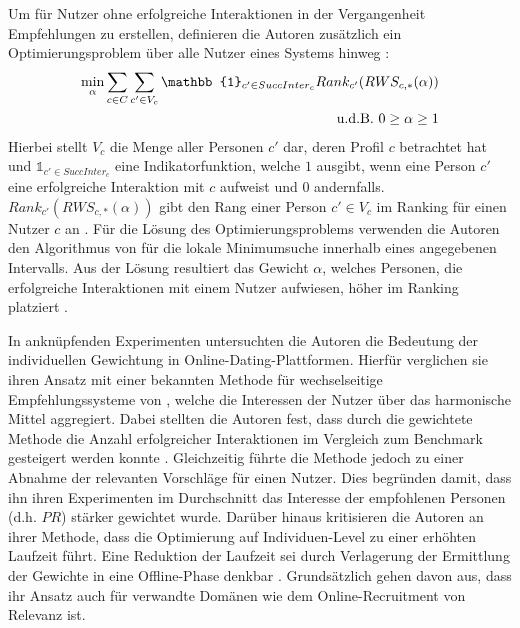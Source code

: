 Um für Nutzer ohne erfolgreiche Interaktionen in der Vergangenheit Empfehlungen zu erstellen, definieren die Autoren zusätzlich ein Optimierungsproblem über alle Nutzer eines Systems hinweg \cite[S. 135]{kleinerman:2:inproceedings}:
\begin{equation}\label{eq37}
    \begin{aligned}
        \min_{\alpha} \sum_{c \in C} \sum_{c' \in V_{c}} \mathbb{1}_{c' \in SuccInter_{c}} Rank_{c'} (RWS_{c,*}(\alpha))\\
        \textnormal{u.d.B. } 0 \geq \alpha \geq 1\\
    \end{aligned}
\end{equation}
Hierbei stellt $V_{c}$ die Menge aller Personen $c'$ dar, deren Profil $c$ betrachtet hat und $\mathbb{1}_{c' \in SuccInter_{c}}$ eine Indikatorfunktion, welche $1$ ausgibt, wenn eine Person $c'$ eine erfolgreiche Interaktion mit $c$ aufweist und $0$ andernfalls.
$Rank_{c'} (RWS_{c,*}(\alpha))$ gibt den Rang einer Person $c' \in V_{c}$ im Ranking für einen Nutzer $c$ an \cite[S. 135]{kleinerman:2:inproceedings}.
Für die Lösung des Optimierungsproblems verwenden die Autoren den Algorithmus von \textcite[S. 422ff.]{brent:article} für die lokale Minimumsuche innerhalb eines angegebenen Intervalls.
Aus der Lösung resultiert das Gewicht $\alpha$, welches Personen, die erfolgreiche Interaktionen mit einem Nutzer aufwiesen, höher im Ranking platziert \cite[S. 135]{kleinerman:2:inproceedings}.

In anknüpfenden Experimenten untersuchten die Autoren die Bedeutung der individuellen Gewichtung in Online-Dating-Plattformen.
Hierfür verglichen sie ihren Ansatz mit einer bekannten Methode für wechselseitige Empfehlungssysteme von \textcite[S. 6]{xia:inproceedings}, welche die Interessen der Nutzer über das harmonische Mittel aggregiert.
Dabei stellten die Autoren fest, dass durch die gewichtete Methode die Anzahl erfolgreicher Interaktionen im Vergleich zum Benchmark gesteigert werden konnte \cite[S. 132]{kleinerman:2:inproceedings}.
Gleichzeitig führte die Methode jedoch zu einer Abnahme der relevanten Vorschläge für einen Nutzer.
Dies begründen \textcite[S. 132]{kleinerman:2:inproceedings} damit, dass ihn ihren Experimenten im Durchschnitt das Interesse der empfohlenen Personen (d.h. $PR$) stärker gewichtet wurde.
Darüber hinaus kritisieren die Autoren an ihrer Methode, dass die Optimierung auf Individuen-Level zu einer erhöhten Laufzeit führt.
Eine Reduktion der Laufzeit sei durch Verlagerung der Ermittlung der Gewichte in eine Offline-Phase denkbar \cite[S. 138]{kleinerman:2:inproceedings}.
Grundsätzlich gehen  \textcite[S. 138]{kleinerman:2:inproceedings} davon aus, dass ihr Ansatz auch für verwandte Domänen wie dem Online-Recruitment von Relevanz ist.

